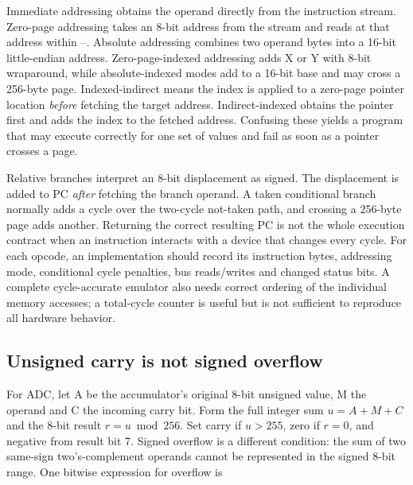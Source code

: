 \hypertarget{01-foundations-i-ch016-addressing-is-an-algorithm-for-finding-a-value-not-a-suffix}{}

Immediate addressing obtains the operand directly from the instruction stream. Zero-page addressing takes an 8-bit address from the stream and reads at that address within --. Absolute addressing combines two operand bytes into a 16-bit little-endian address. Zero-page-indexed addressing adds X or Y with 8-bit wraparound, while absolute-indexed modes add to a 16-bit base and may cross a 256-byte page. Indexed-indirect means the index is applied to a zero-page pointer location \emph{before} fetching the target address. Indirect-indexed obtains the pointer first and adds the index to the fetched address. Confusing these yields a program that may execute correctly for one set of values and fail as soon as a pointer crosses a page.

Relative branches interpret an 8-bit displacement as signed. The displacement is added to PC \emph{after} fetching the branch operand. A taken conditional branch normally adds a cycle over the two-cycle not-taken path, and crossing a 256-byte page adds another. Returning the correct resulting PC is not the whole execution contract when an instruction interacts with a device that changes every cycle. For each opcode, an implementation should record its instruction bytes, addressing mode, conditional cycle penalties, bus reads/writes and changed status bits. A complete cycle-accurate emulator also needs correct ordering of the individual memory accesses; a total-cycle counter is useful but is not sufficient to reproduce all hardware behavior.

\subsection{Unsigned carry is not signed overflow}\label{01-foundations-i-ch016-unsigned-carry-is-not-signed-overflow}

\hypertarget{01-foundations-i-ch016-unsigned-carry-is-not-signed-overflow}{}

For ADC, let A be the accumulator's original 8-bit unsigned value, M the operand and C the incoming carry bit. Form the full integer sum \(u=A+M+C\) and the 8-bit result \(r=u\bmod256\). Set carry if \(u>255\), zero if \(r=0\), and negative from result bit 7. Signed overflow is a different condition: the sum of two same-sign two's-complement operands cannot be represented in the signed 8-bit range. One bitwise expression for overflow is

